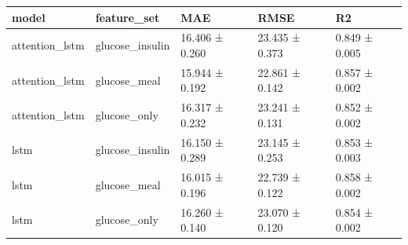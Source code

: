 \begin{tabular}{lllll}
\toprule
model & feature_set & MAE & RMSE & R2 \\
\midrule
attention_lstm & glucose_insulin & 16.406 ± 0.260 & 23.435 ± 0.373 & 0.849 ± 0.005 \\
attention_lstm & glucose_meal & 15.944 ± 0.192 & 22.861 ± 0.142 & 0.857 ± 0.002 \\
attention_lstm & glucose_only & 16.317 ± 0.232 & 23.241 ± 0.131 & 0.852 ± 0.002 \\
lstm & glucose_insulin & 16.150 ± 0.289 & 23.145 ± 0.253 & 0.853 ± 0.003 \\
lstm & glucose_meal & 16.015 ± 0.196 & 22.739 ± 0.122 & 0.858 ± 0.002 \\
lstm & glucose_only & 16.260 ± 0.140 & 23.070 ± 0.120 & 0.854 ± 0.002 \\
\bottomrule
\end{tabular}
